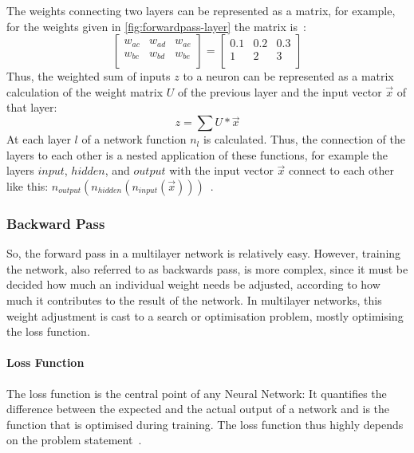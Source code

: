 The weights connecting two layers can be represented as a matrix, for example, for the weights given in \autoref{fig:forwardpass-layer} the matrix is~\autocite[Chapter~4.2]{Skansi2018}:
\begin{equation}
    \begin{bmatrix} 
	    w_{ac} & w_{ad}  & w_{ae}  \\
	    w_{bc}  & w_{bd}  & w_{be} \\
	\end{bmatrix}
    =
	\begin{bmatrix} 
	    0.1 & 0.2 & 0.3  \\
	    1  & 2  & 3 \\
	\end{bmatrix}
    \label{eq:forward-matrix}
\end{equation}
Thus, the weighted sum of inputs $z$ to a neuron can be represented as a matrix calculation of the weight matrix $U$ of the previous layer and the input vector $\vec{x}$ of that layer:
\begin{equation}
    z = \sum U *\vec{x}
    \label{eq:forward-matrix-calc}
\end{equation}
At each layer $l$ of a network function $n_l$ is calculated.
Thus, the connection of the layers to each other is a nested application of these functions, for example the layers $input$, $hidden$, and $output$ with the input vector $\vec{x}$ connect to each other like this: $n_{output}(n_{hidden}(n_{input}(\vec{x})))$~\autocite[Chapter~4.3]{Skansi2018}.

\subsubsection{Backward Pass}\label{subsubsec:backward-pass}
So, the forward pass in a multilayer network is relatively easy.
However, training the network, also referred to as backwards pass, is more complex, since it must be decided how much an individual weight needs be adjusted, according to how much it contributes to the result of the network.
In multilayer networks, this weight adjustment is cast to a search or optimisation problem, mostly optimising the loss function.

\paragraph{Loss Function} \label{subsubsec:lossfunction}
The loss function is the central point of any Neural Network: It quantifies the difference between the expected and the actual output of a network and is the function that is optimised during training.
The loss function thus highly depends on the problem statement~\autocite[Chapter~1.2.1]{Aggarwal2018}.

